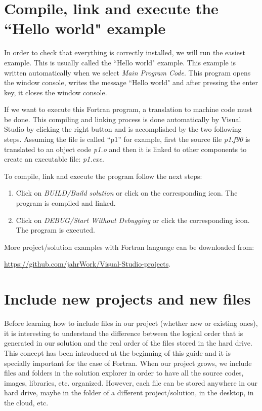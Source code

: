     \section{Compile, link and execute the ``Hello world" example}

In order to check that everything is correctly installed, we will run the easiest example. This is usually called the ``Hello world" example. This example is written automatically when we select 
\textit{Main Program Code}. This program opens the window console, writes the message ``Hello world" and after pressing the enter key, it closes the window console. 

If we want to execute this Fortran program, a translation to machine code must be done. This compiling and linking process is done automatically by Visual Studio by clicking the right button and is accomplished by the two following steps. Assuming the file is called ``p1'' for example, first the source file \textit{p1.f90} is translated to an object code \textit{p1.o} and then it is linked to other components to create an executable file: \textit{p1.exe}. 
  
\newpage
To compile, link and execute the program follow the next steps:

\begin{enumerate}[nosep]
	\item Click on \textit{BUILD/Build solution} or click on the corresponding icon. The program is compiled and linked. 
	\item Click on \textit{DEBUG/Start Without Debugging} or click the corresponding icon. The program is executed. 
\end{enumerate}
    
%   

\begin{IN}
    More project/solution examples with Fortran language can be downloaded from: 
    
     \url{https://github.com/jahrWork/Visual-Studio-projects}.
\end{IN}


    \section{Include new projects and new files} \label{sec:Include}

Before learning how to include files in our project (whether new or existing ones), it is interesting to understand the difference between the logical order that is generated in our solution and the real order of the files stored in the hard drive. This concept has been introduced at the beginning of this guide and it is specially important for the case of Fortran. When our project grows, we include files and folders in the solution explorer in order to have all the source codes, images, libraries, etc. organized. However, each file can be stored anywhere in our hard drive, maybe in the folder of a different project/solution, in the desktop, in the cloud, etc. 

